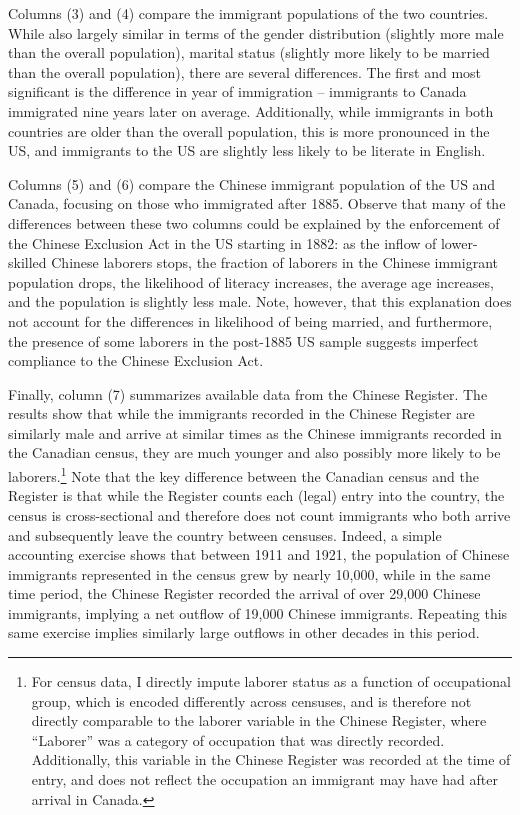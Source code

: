 Columns (3) and (4) compare the immigrant populations of the two countries. While also largely similar in terms of the gender distribution (slightly more male than the overall population), marital status (slightly more likely to be married than the overall population), there are several differences. The first and most significant is the difference in year of immigration -- immigrants to Canada immigrated nine years later on average. Additionally, while immigrants in both countries are older than the overall population, this is more pronounced in the US, and immigrants to the US are slightly less likely to be literate in English. 

Columns (5) and (6) compare the Chinese immigrant population of the US and Canada, focusing on those who immigrated after 1885. Observe that many of the differences between these two columns could be explained by the enforcement of the Chinese Exclusion Act in the US starting in 1882: as the inflow of lower-skilled Chinese laborers stops, the fraction of laborers in the Chinese immigrant population drops, the likelihood of literacy increases, the average age increases, and the population is slightly less male. Note, however, that this explanation does not account for the differences in likelihood of being married, and furthermore, the presence of some laborers in the post-1885 US sample suggests imperfect compliance to the Chinese Exclusion Act. 

Finally, column (7) summarizes available data from the Chinese Register. The results show that while the immigrants recorded in the Chinese Register are similarly male and arrive at similar times as the Chinese immigrants recorded in the Canadian census, they are much younger and also possibly more likely to be laborers.\footnote{For census data, I directly impute laborer status as a function of occupational group, which is encoded differently across censuses, and is therefore not directly comparable to the laborer variable in the Chinese Register, where ``Laborer'' was a category of occupation that was directly recorded. Additionally, this variable in the Chinese Register was recorded at the time of entry, and does not reflect the occupation an immigrant may have had after arrival in Canada.}
Note that the key difference between the Canadian census and the Register is that while the Register counts each (legal) entry into the country, the census is cross-sectional and therefore does not count immigrants who both arrive and subsequently leave the country between censuses. Indeed, a simple accounting exercise shows that between 1911 and 1921, the population of Chinese immigrants represented in the census grew by nearly 10,000, while in the same time period, the Chinese Register recorded the arrival of over 29,000 Chinese immigrants, implying a net outflow of 19,000 Chinese immigrants. Repeating this same exercise implies similarly large outflows in other decades in this period. 
